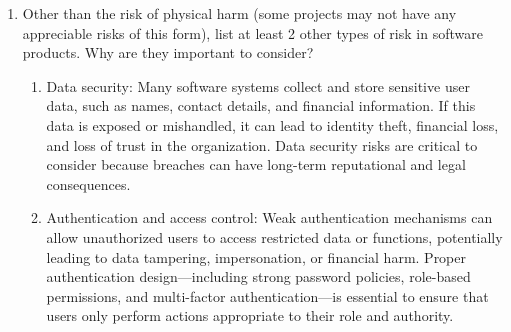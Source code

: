 \documentclass{article}
\begin{document}
\begin{enumerate}
\begin{enumerate}
    \end{enumerate}
    \item Other than the risk of physical harm (some projects may not have any
    appreciable risks of this form), list at least 2 other types of risk in
    software products. Why are they important to consider?
    \begin{enumerate}
        \item Data security: Many software systems collect and store sensitive user data, such as names, contact details, and financial information. If this data is exposed or mishandled, it can lead to identity theft, financial loss, and loss of trust in the organization. Data security risks are critical to consider because breaches can have long-term reputational and legal consequences.
        \item Authentication and access control: Weak authentication mechanisms can allow unauthorized users to access restricted data or functions, potentially leading to data tampering, impersonation, or financial harm. Proper authentication design—including strong password policies, role-based permissions, and multi-factor authentication—is essential to ensure that users only perform actions appropriate to their role and authority.
    \end{enumerate}
\end{enumerate}
\end{document}
